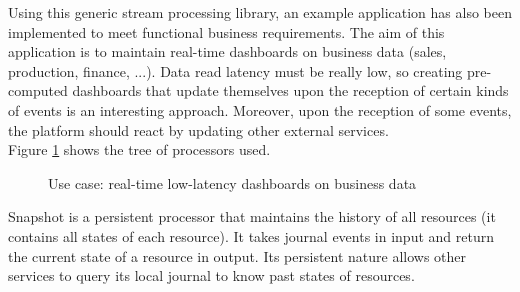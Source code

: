 Using this generic stream processing library, an example application has also been implemented to meet functional business requirements. The aim of this application is to
maintain real-time dashboards on business data (sales, production, finance, ...). Data read latency must be really low, so creating pre-computed dashboards that
update themselves upon the reception of certain kinds of events is an interesting approach. Moreover, upon the reception of some events, the platform should react by updating other external services.
\\

Figure \ref{fig:exampleapp} shows the tree of processors used. 

\begin{figure}[h]
  \begin{center} 
    \caption{Use case: real-time low-latency dashboards on business data}
    \label{fig:exampleapp}
  \end{center}
\end{figure}

Snapshot is a persistent processor that maintains the history of all resources (it contains all states of each resource). It takes journal events in input and return the current
state of a resource in output. Its persistent nature allows other services to query its local journal to know past states of resources.

